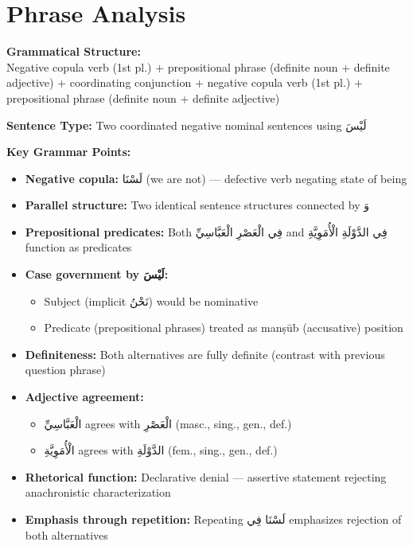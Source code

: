 \documentclass[letterpaper,12pt]{article}
\begin{document}
\section{Phrase Analysis}

\begin{tcolorbox}[colback=boxcolor,colframe=headercolor,breakable]
\textbf{Grammatical Structure:}\\
Negative copula verb (1st pl.) + prepositional phrase (definite noun + definite adjective) + coordinating conjunction + negative copula verb (1st pl.) + prepositional phrase (definite noun + definite adjective)

\vspace{0.5em}
\textbf{Sentence Type:} Two coordinated negative nominal sentences using \textarabic{لَيْسَ}

\vspace{0.5em}
\textbf{Key Grammar Points:}
\begin{itemize}
\item \textbf{Negative copula:} \textarabic{لَسْنَا} (we are not) — defective verb negating state of being
\item \textbf{Parallel structure:} Two identical sentence structures connected by \textarabic{وَ}
\item \textbf{Prepositional predicates:} Both \textarabic{فِي الْعَصْرِ الْعَبَّاسِيِّ} and \textarabic{فِي الدَّوْلَةِ الْأُمَوِيَّةِ} function as predicates
\item \textbf{Case government by \textarabic{لَيْسَ}:}
  \begin{itemize}
    \item Subject (implicit \textarabic{نَحْنُ}) would be nominative
    \item Predicate (prepositional phrases) treated as manṣūb (accusative) position
  \end{itemize}
\item \textbf{Definiteness:} Both alternatives are fully definite (contrast with previous question phrase)
\item \textbf{Adjective agreement:}
  \begin{itemize}
    \item \textarabic{الْعَبَّاسِيِّ} agrees with \textarabic{الْعَصْرِ} (masc., sing., gen., def.)
    \item \textarabic{الْأُمَوِيَّةِ} agrees with \textarabic{الدَّوْلَةِ} (fem., sing., gen., def.)
  \end{itemize}
\item \textbf{Rhetorical function:} Declarative denial — assertive statement rejecting anachronistic characterization
\item \textbf{Emphasis through repetition:} Repeating \textarabic{لَسْنَا فِي} emphasizes rejection of both alternatives
\end{itemize}
\end{tcolorbox}
\end{document}
